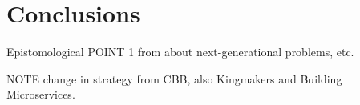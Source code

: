 \chapter{Conclusions}\label{ch:conclusions}

Epistomological
POINT 1 from about next-generational problems, etc.

NOTE change in strategy from CBB, also Kingmakers and Building Microservices.

\listoftodos